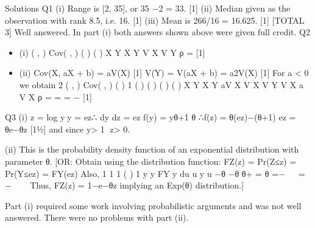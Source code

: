 \documentclass[a4paper,12pt]{article}
\begin{document}
Solutions
Q1 (i) Range is [2, 35], or 35 −2 = 33. [1]
(ii) Median given as the observation with rank 8.5, i.e. 16. [1]
(iii) Mean is 266/16 = 16.625. [1]
[TOTAL 3]
Well answered. In part (i) both answers shown above were given full credit.
Q2 
\begin{itemize}
\item (i) ( , ) Cov( , )
( ) ( )
X Y X Y
V X V Y
ρ = [1]

\item (ii) Cov(X, aX + b) = aV(X) [1]
V(Y) = V(aX + b) = a2V(X) [1]
For a < 0 we obtain
2
( , ) Cov( , ) ( ) 1
( ) ( ) ( ) ( )
X Y X Y aV X
V X V Y V X a V X
ρ = = = − [1]
\end{itemize}
Q3 (i) z = log yy = ez∴ dy
dz
= ez
f(y) = yθ+1
θ
∴f(z) = θ(ez)−(θ+1) ez = θe−θz [1½]
and since y> 1 z> 0. 

(ii) This is the probability density function of an exponential distribution with
parameter θ. 
[OR: Obtain using the distribution function:
    FZ(z) = Pr(Z≤z) = Pr(Y≤ez) = FY(ez)
  Also, 1 1
  1
  ( ) 1
  y y
  FY y du u y
  u
  −θ −θ
  θ+
    = θ =−   = −   
  Thus, FZ(z) = 1−e−θz implying an Exp(θ) distribution.]

Part (i) required some work involving probabilistic arguments and was not well
answered. There were no problems with part (ii).
\end{document}

